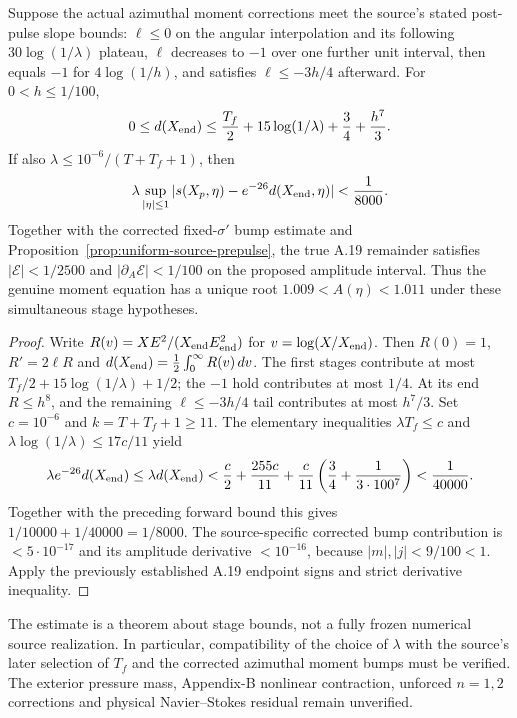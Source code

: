 \begin{proposition}
\label{prop:source-full-bias-explicit}
Suppose the actual azimuthal moment corrections meet the source's
stated post-pulse slope bounds: $\ell\le0$ on the angular
interpolation and its following $30\log(1/\lambda)$ plateau,
$\ell$ decreases to $-1$ over one further unit interval,
then equals $-1$ for $4\log(1/h)$, and satisfies
$\ell\le-3h/4$ afterward. For $0<h\le1/100$,
\[
0\le d(X_{\rm end})
\le\frac{T_f}{2}+15\log(1/\lambda)+\frac34+\frac{h^7}{3}.
\]
If also $\lambda\le10^{-6}/(T+T_f+1)$, then
\[
\lambda\sup_{|\eta|\le1}
|s(X_p,\eta)-e^{-26}d(X_{\rm end},\eta)|<\frac1{8000}.
\]
Together with the corrected fixed-$\sigma'$ bump estimate and
Proposition~\ref{prop:uniform-source-prepulse}, the true A.19
remainder satisfies $|\mathcal E|<1/2500$ and
$|\partial_A\mathcal E|<1/100$ on the proposed amplitude interval.
Thus the genuine moment equation has a unique root
$1.009<A(\eta)<1.011$ under these simultaneous stage hypotheses.
\end{proposition}
\begin{proof}
Write $R(v)=XE^2/(X_{\rm end}E_{\rm end}^2)$ for
$v=\log(X/X_{\rm end})$. Then $R(0)=1$, $R'=2\ell R$ and
$d(X_{\rm end})=\tfrac12\int_0^\infty R(v)\,dv$.
The first stages contribute at most
$T_f/2+15\log(1/\lambda)+1/2$; the $-1$ hold contributes at most
$1/4$. At its end $R\le h^8$, and the remaining
$\ell\le-3h/4$ tail contributes at most $h^7/3$.
Set $c=10^{-6}$ and $k=T+T_f+1\ge11$.
The elementary inequalities $\lambda T_f\le c$ and
$\lambda\log(1/\lambda)\le17c/11$ yield
\[
\lambda e^{-26}d(X_{\rm end})\le\lambda d(X_{\rm end})
<\frac c2+\frac{255c}{11}
+\frac c{11}\left(\frac34+\frac1{3\cdot100^7}\right)
<\frac1{40000}.
\]
Together with the preceding forward bound this gives
$1/10000+1/40000=1/8000$. The source-specific corrected
bump contribution is $<5\cdot10^{-17}$ and its amplitude
derivative $<10^{-16}$, because $|m|,|j|<9/100<1$.
Apply the previously established A.19 endpoint signs and
strict derivative inequality.
\end{proof}

The estimate is a theorem about stage bounds, not a fully
frozen numerical source realization. In particular, compatibility
of the choice of $\lambda$ with the source's later selection of $T_f$
and the corrected azimuthal moment bumps must be verified. The
exterior pressure mass, Appendix-B nonlinear contraction,
unforced $n=1,2$ corrections and physical Navier--Stokes residual
remain unverified.
